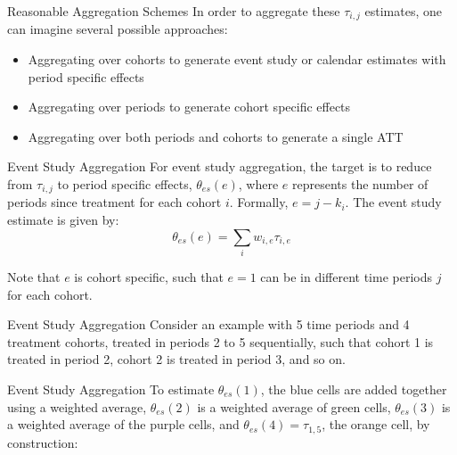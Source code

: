 \documentclass[11pt]{beamer}
\begin{document}
\begin{frame}{Reasonable Aggregation Schemes}
    In order to aggregate these $\tau_{i,j}$ estimates, one can imagine several possible approaches:

    \begin{itemize}
        \item Aggregating over cohorts to generate event study or calendar estimates with period specific effects
        \item Aggregating over periods to generate cohort specific effects
        \item Aggregating over both periods and cohorts to generate a single ATT
    \end{itemize}
\end{frame}

\begin{frame}{Event Study Aggregation}
    For event study aggregation, the target is to reduce from $\tau_{i,j}$ to period specific effects, $\theta_{es}(e)$, where $e$ represents the number of periods since treatment for each cohort $i$. Formally, $e = j - k_i$. The event study estimate is given by:
    \begin{equation}
        \theta_{es}(e) = \sum_i w_{i,e} \tau_{i,e}
    \end{equation}

    Note that $e$ is cohort specific, such that $e = 1$ can be in different time periods $j$ for each cohort. 
\end{frame}

\begin{frame}{Event Study Aggregation}
    Consider an example with 5 time periods and 4 treatment cohorts, treated in periods 2 to 5 sequentially, such that cohort 1 is treated in period 2, cohort 2 is treated in period 3, and so on.
    
\end{frame}

\begin{frame}{Event Study Aggregation}
    To estimate $\theta_{es}(1)$, the blue cells are added together using a weighted average, $\theta_{es}(2)$ is a weighted average of green cells, $\theta_{es}(3)$ is a weighted average of the purple cells, and $\theta_{es}(4) = \tau_{1,5}$, the orange cell, by construction:

    
\end{frame}
\end{document}
